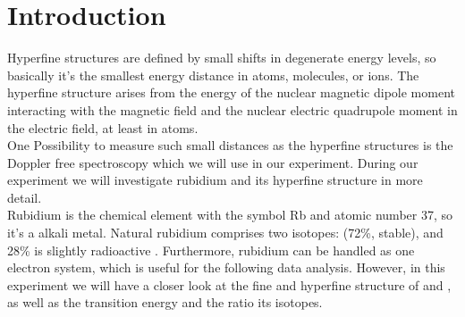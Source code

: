 \chapter{Introduction}
Hyperfine structures are defined by small shifts in degenerate energy levels, so basically it's the 
smallest energy distance in atoms, molecules, or ions. 
The hyperfine structure arises from the energy of the nuclear magnetic dipole moment interacting with the magnetic field
 and the nuclear electric quadrupole moment in the electric field, at least in atoms.\\
One Possibility to measure such small distances as the hyperfine structures is the Doppler free spectroscopy
which we will use in our experiment. 
During our experiment we will investigate rubidium and its hyperfine structure in more detail.\\
Rubidium is the chemical element with the symbol Rb and atomic number 37, so it’s a alkali metal. 
Natural rubidium comprises two isotopes:  (72\%, stable), and 28\% is slightly radioactive .
Furthermore, rubidium can be handled as one electron system, which is useful for the following data analysis. 
However, in this experiment we will have a closer look at the fine and hyperfine structure of 
 and , as well as the transition energy and the ratio its isotopes. 
